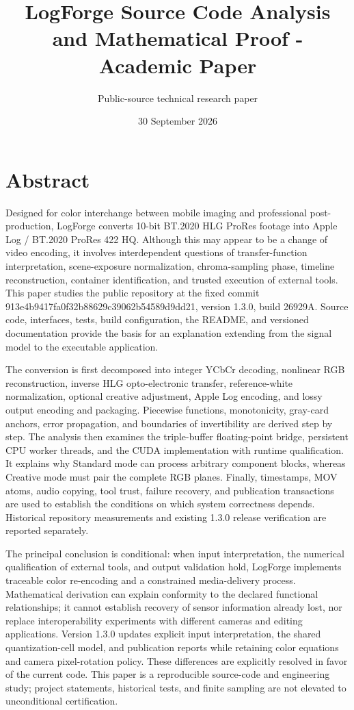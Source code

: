 \documentclass[11pt,a4paper,openany]{book}
\title{LogForge Source Code Analysis and Mathematical Proof - Academic Paper}
\author{Public-source technical research paper}\date{30 September 2026}
\begin{document}
\maketitle\tableofcontents

\chapter*{Abstract}
Designed for color interchange between mobile imaging and professional post-production, LogForge converts 10-bit BT.2020 HLG ProRes footage into Apple Log / BT.2020 ProRes 422 HQ. Although this may appear to be a change of video encoding, it involves interdependent questions of transfer-function interpretation, scene-exposure normalization, chroma-sampling phase, timeline reconstruction, container identification, and trusted execution of external tools. This paper studies the public repository at the fixed commit 913e4b9417fa0f32b88629c39062b54589d9dd21, version 1.3.0, build 26929A. Source code, interfaces, tests, build configuration, the README, and versioned documentation provide the basis for an explanation extending from the signal model to the executable application.

The conversion is first decomposed into integer YCbCr decoding, nonlinear RGB reconstruction, inverse HLG opto-electronic transfer, reference-white normalization, optional creative adjustment, Apple Log encoding, and lossy output encoding and packaging. Piecewise functions, monotonicity, gray-card anchors, error propagation, and boundaries of invertibility are derived step by step. The analysis then examines the triple-buffer floating-point bridge, persistent CPU worker threads, and the CUDA implementation with runtime qualification. It explains why Standard mode can process arbitrary component blocks, whereas Creative mode must pair the complete RGB planes. Finally, timestamps, MOV atoms, audio copying, tool trust, failure recovery, and publication transactions are used to establish the conditions on which system correctness depends. Historical repository measurements and existing 1.3.0 release verification are reported separately.

The principal conclusion is conditional: when input interpretation, the numerical qualification of external tools, and output validation hold, LogForge implements traceable color re-encoding and a constrained media-delivery process. Mathematical derivation can explain conformity to the declared functional relationships; it cannot establish recovery of sensor information already lost, nor replace interoperability experiments with different cameras and editing applications. Version 1.3.0 updates explicit input interpretation, the shared quantization-cell model, and publication reports while retaining color equations and camera pixel-rotation policy. These differences are explicitly resolved in favor of the current code. This paper is a reproducible source-code and engineering study; project statements, historical tests, and finite sampling are not elevated to unconditional certification.
\end{document}
